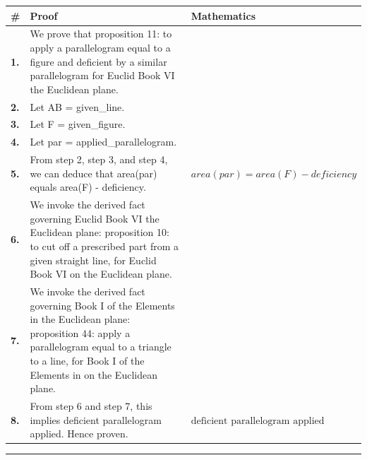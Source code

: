 \documentclass[11pt]{article}
\theoremstyle{definition}
\begin{document}
\begin{tabular}{@{} >{\raggedright\arraybackslash}p{} >{\raggedright\arraybackslash}p{} >{\raggedleft\arraybackslash}p{} @{}}
\textbf{\#} & \textbf{Proof} & \textbf{Mathematics} \\
\midrule
\textbf{1.} & We prove that proposition 11: to apply a parallelogram equal to a figure and deficient by a similar parallelogram for Euclid Book VI the Euclidean plane. & \\[0.45em]
\textbf{2.} & Let AB = given\_line. & \\[0.45em]
\textbf{3.} & Let F = given\_figure. & \\[0.45em]
\textbf{4.} & Let par = applied\_parallelogram. & \\[0.45em]
\textbf{5.} & From step 2, step 3, and step 4, we can deduce that area(par) equals area(F) - deficiency. & $\displaystyle area(par) = area(F) - deficiency$ \\[0.45em]
\textbf{6.} & We invoke the derived fact governing Euclid Book VI the Euclidean plane: proposition 10: to cut off a prescribed part from a given straight line, for Euclid Book VI on the Euclidean plane. & \\[0.45em]
\textbf{7.} & We invoke the derived fact governing Book I of the Elements in the Euclidean plane: proposition 44: apply a parallelogram equal to a triangle to a line, for Book I of the Elements in on the Euclidean plane. & \\[0.45em]
\textbf{8.} & From step 6 and step 7, this implies deficient parallelogram applied. Hence proven. & $\displaystyle \text{deficient parallelogram applied}$ \\[0.45em]
\bottomrule
\end{tabular}
\label{thm:Geometry-Euclid Book VI-proposition_11_to_apply_a_parallelogram_equal_to_a_figure_and_deficient_by_a_similar_parallelogram}
\par\medskip\hrule
\end{document}
